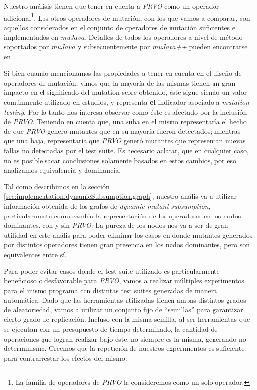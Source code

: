 Nuestro an\'alisis tienen que tener en cuenta a \emph{PRVO} como un operador adicional\footnote{La familia de operadores de \emph{PRVO} la consideremos como un solo operador.}. Los otros operadores de mutaci\'on, con los que vamos a comparar, son aquellos considerados en el conjunto de operadores de mutaci\'on suficientes \cite{bibliography.mutation.selection.Offutt96, bibliography.mutation.selection.ASN2008} e implementados en \emph{mu$Java$}. Detalles de todos los operadores a nivel de m\'etodo soportados por \emph{mu$Java$} y subsecuentemente por \emph{mu$Java$++} pueden encontrarse en \cite{muJavaMOPS}. 

Si bien cuando mencionamos las propiedades a tener en cuenta en el dise\~no de operadores de mutaci\'on, vimos que la mayor\'ia de las mismas tienen un gran impacto en el significado del mutation score obtenido, \'este sigue siendo un valor com\'unmente utilizado en estudios, y representa \textbf{el} indicador asociado a \emph{mutation testing}. Por lo tanto nos interesa observar como \'este es afectado por la inclusi\'on de \emph{PRVO}. Teniendo en cuenta que, una suba en el mismo representar\'ia el hecho de que \emph{PRVO} gener\'o mutantes que en su mayor\'ia fueron detectados; mientras que una baja, representar\'ia que \emph{PRVO} gener\'o mutantes que representan nuevas fallas no detectadas por el test suite. Es necesario aclarar, que en cualquier caso, no es posible sacar conclusiones solamente basados en estos cambios, por eso analizamos equivalencia y dominancia.

Tal como describimos en la secci\'on \ref{sec:implementation.dynamicSubsumption.graph}, nuestro an\'alis va a utilizar informaci\'on obtenida de los grafos de \emph{dynamic mutant subsumption}, particularmente como cambia la representaci\'on de los operadores en los nodos dominantes, con y sin \emph{PRVO}. La pureza de los nodos nos va a ser de gran utilidad en este an\'alis para poder eliminar los casos en donde mutantes generados por distintos operadores tienen gran presencia en los nodos dominantes, pero son equivalentes entre s\'i.

Para poder evitar casos donde el test suite utilizado es particularmente beneficioso o desfavorable para \emph{PRVO}, vamos a realizar m\'ultiples experimentos para el mismo programa con distintas test suites generadas de manera autom\'atica. Dado que las herramientas utilizadas tienen ambas distintos grados de aleatoriedad, vamos a utilizar un conjunto fijo de ``semillas'' para garantizar cierto grado de replicaci\'on. Incluso con la misma semilla, al ser herramientas que se ejecutan con un presupuesto de tiempo determinado, la cantidad de operaciones que logran realizar bajo \'este, no siempre es la misma, generando no determinismo. Creemos que la repetici\'on de nuestros experimentos es suficiente para contrarrestar los efectos del mismo.

